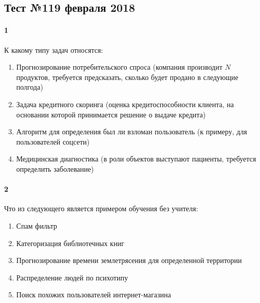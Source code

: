 \documentclass[a4paper,12pt]{article}
\begin{document}
  \subsection*{Тест №1\hfill{19 февраля 2018}}


  \paragraph{1} К какому типу задач относятся:
  \begin{enumerate}
    \item Прогнозирование потребительского спроса (компания производит $N$ продуктов, требуется предсказать, сколько будет продано в следующие полгода)\\
    \makebox[\linewidth]{\hrulefill}
    \item Задача кредитного скоринга (оценка кредитоспособности клиента, на основании которой принимается решение о выдаче кредита)\\
    \makebox[\linewidth]{\hrulefill}
    \item Алгоритм для определения был ли взломан пользователь (к примеру, для пользователей соцсети)\\
    \makebox[\linewidth]{\hrulefill}
    \item Медицинская диагностика (в роли объектов выступают пациенты, требуется определить заболевание)\\
    \makebox[\linewidth]{\hrulefill}

  \end{enumerate}

	\paragraph{2} Что из следующего является примером обучения без учителя:
    \begin{enumerate}
      \item Спам фильтр
      \item Категоризация библиотечных книг
      \item Прогнозирование времени землетрясения для определенной территории
      \item Распределение людей по психотипу
      \item Поиск похожих пользователей интернет-магазина
    \end{enumerate}    	
	
\end{document}
